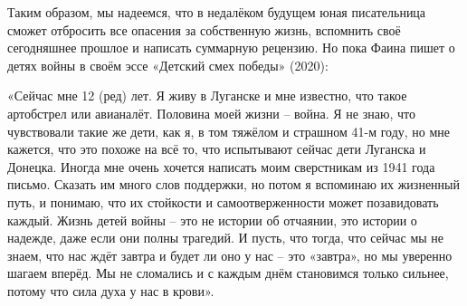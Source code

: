 Таким образом, мы надеемся, что в недалёком будущем юная писательница сможет
отбросить все опасения за собственную жизнь, вспомнить своё сегодняшнее прошлое
и написать суммарную рецензию. Но пока Фаина пишет о детях войны в своём эссе
«Детский смех победы» (2020):

\begin{zzquote}
«Сейчас мне 12 (ред) лет. Я живу в Луганске и мне известно, что такое
артобстрел или авианалёт. Половина моей жизни – война. Я не знаю, что
чувствовали такие же дети, как я, в том тяжёлом и страшном 41-м году, но мне
кажется, что это похоже на всё то, что испытывают сейчас дети Луганска и
Донецка. Иногда мне очень хочется написать моим сверстникам из 1941 года
письмо. Сказать им много слов поддержки, но потом я вспоминаю их жизненный
путь, и понимаю, что их стойкости и самоотверженности может позавидовать
каждый. Жизнь детей войны – это не истории об отчаянии, это истории о надежде,
даже если они полны трагедий. И пусть, что тогда, что сейчас мы не знаем, что
нас ждёт завтра и будет ли оно у нас – это «завтра», но мы уверенно шагаем
вперёд. Мы не сломались и с каждым днём становимся только сильнее, потому что
сила духа у нас в крови».
\end{zzquote}
